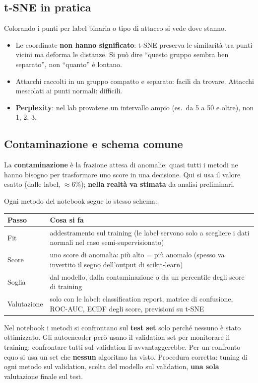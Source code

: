 \subsection{t-SNE in pratica}
Colorando i punti per label binaria o tipo di attacco si vede dove stanno.
\begin{itemize}
  \item Le coordinate \textbf{non hanno significato}: t-SNE preserva le similarità tra punti vicini ma deforma le distanze. Si può dire
        ``questo gruppo sembra ben separato'', non ``quanto'' è lontano.
  \item Attacchi raccolti in un gruppo compatto e separato: facili da trovare. Attacchi mescolati ai punti normali: difficili.
  \item \textbf{Perplexity}: nel lab provatene un intervallo ampio (es.\ da 5 a 50 e oltre), non 1, 2, 3.
\end{itemize}

\subsection{Contaminazione e schema comune}
La \textbf{contaminazione} è la frazione attesa di anomalie: quasi tutti i metodi ne hanno bisogno per trasformare uno score in una
decisione. Qui si usa il valore esatto (dalle label, $\approx 6\%$); \textbf{nella realtà va stimata} da analisi preliminari.

Ogni metodo del notebook segue lo stesso schema:
\begin{center}
\small
\begin{tabularx}{\textwidth}{l X}
\toprule
\textbf{Passo} & \textbf{Cosa si fa}\\
\midrule
Fit & addestramento sul training (le label servono solo a scegliere i dati normali nel caso semi-supervisionato)\\
Score & uno score di anomalia: più alto = più anomalo (spesso va invertito il segno dell'output di scikit-learn)\\
Soglia & dal modello, dalla contaminazione o da un percentile degli score di training\\
Valutazione & solo con le label: classification report, matrice di confusione, ROC-AUC, ECDF degli score, previsioni su t-SNE\\
\bottomrule
\end{tabularx}
\end{center}

\begin{esame}
Nel notebook i metodi si confrontano sul \textbf{test set} solo perché nessuno è stato ottimizzato. Gli autoencoder però usano il
validation set per monitorare il training: confrontare tutti sul validation li avvantaggerebbe. Per un confronto equo si usa un set
che \textbf{nessun} algoritmo ha visto. Procedura corretta: tuning di ogni metodo sul validation, scelta del modello sul validation,
\textbf{una sola} valutazione finale sul test.
\end{esame}

